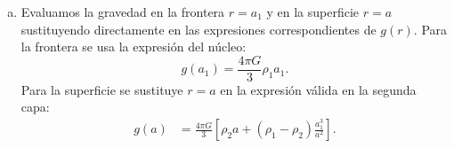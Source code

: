\begin{enumerate}[a)]
    En particular, si $r<a_1$, la trayectoria de integración atraviesa las tres regiones y la integral se separa en sus fronteras:
    $$
    \begin{aligned}
    \Phi(r)
    &=-\left[
    \int_r^{a_1}\frac{4\pi G}{3}\rho_1s\,ds
    +\int_{a_1}^{a}\frac{4\pi G}{3}
    \left(\rho_2s+(\rho_1-\rho_2)\frac{a_1^3}{s^2}\right)ds
    +\int_a^\infty\frac{GM}{s^2}\,ds
    \right]\\
    &=-\frac{GM}{a}
    -\frac{2\pi G}{3}\rho_2(a^2-a_1^2)
    -\frac{4\pi G}{3}(\rho_1-\rho_2)a_1^3
    \left(\frac{1}{a_1}-\frac{1}{a}\right)
    -\frac{2\pi G}{3}\rho_1(a_1^2-r^2).
    \end{aligned}
    $$
    Los demás intervalos se calculan de manera análoga, omitiendo las regiones que no atraviesa la integral. El resultado completo es
    $$
    \Phi(r)=
    \begin{cases}
    \begin{aligned}
    -\dfrac{GM}{a}
    &-\dfrac{2\pi G}{3}\rho_2(a^2-a_1^2)\\
    &-\dfrac{4\pi G}{3}(\rho_1-\rho_2)a_1^3
    \left(\dfrac{1}{a_1}-\dfrac{1}{a}\right)
    -\dfrac{2\pi G}{3}\rho_1(a_1^2-r^2)
    \end{aligned}
    & r\leq a_1,\\[3mm]
    \begin{aligned}
    -\dfrac{GM}{a}
    &-\dfrac{2\pi G}{3}\rho_2(a^2-r^2)\\
    &-\dfrac{4\pi G}{3}(\rho_1-\rho_2)a_1^3
    \left(\dfrac{1}{r}-\dfrac{1}{a}\right)
    \end{aligned}
    & a_1<r\leq a,\\[3mm]
    -\dfrac{GM}{r}, & r>a.
    \end{cases}
    $$
    donde $M = \frac{4}{3}\pi [\rho_1 a_1^3 + \rho_2(a^3 - a_1^3)]$.

    \item Evaluamos la gravedad en la frontera $r=a_1$ y en la superficie
    $r=a$ sustituyendo directamente en las expresiones correspondientes de
    $g(r)$. Para la frontera se usa la expresión del núcleo:
    $$
    g(a_1)=\frac{4\pi G}{3}\rho_1a_1.
    $$
    Para la superficie se sustituye $r=a$ en la expresión válida en la segunda
    capa:
    $$
    \begin{aligned}
    g(a)
    &=\frac{4\pi G}{3}
    \left[\rho_2a+(\rho_1-\rho_2)\frac{a_1^3}{a^2}\right].
    \end{aligned}
    $$


\end{enumerate}
